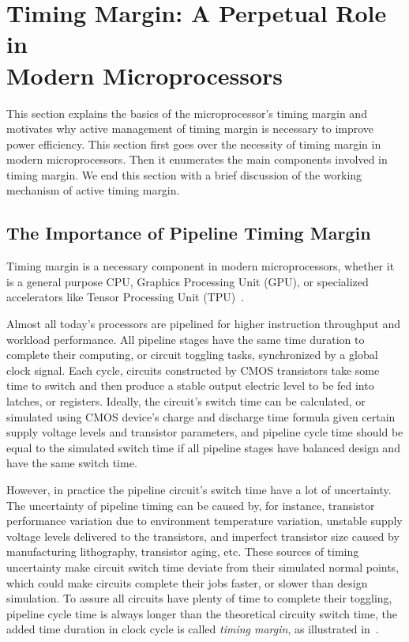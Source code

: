 
\chapter{Timing Margin: A Perpetual Role in \\Modern Microprocessors}
\label{sec:background}

This section explains the basics of the microprocessor's timing margin and motivates why active management of timing margin is necessary to improve power efficiency. This section first goes over the necessity of timing margin in modern microprocessors. Then it enumerates the main components involved in timing margin. We end this section with a brief discussion of the working mechanism of active timing margin.

\section{The Importance of Pipeline Timing Margin}
\label{sec:background:importance}

Timing margin is a necessary component in modern microprocessors, whether it is a general purpose CPU, Graphics Processing Unit (GPU), or specialized accelerators like Tensor Processing Unit (TPU)~\cite{jouppi2017datacenter}.  

Almost all today's processors are pipelined for higher instruction throughput and workload performance. All pipeline stages have the same time duration to complete their computing, or circuit toggling tasks, synchronized by a global clock signal. Each cycle, circuits constructed by CMOS transistors take some time to switch and then produce a stable output electric level to be fed into latches, or registers. Ideally, the circuit's switch time can be calculated, or simulated using CMOS device's charge and discharge time formula given certain supply voltage levels and transistor parameters, and pipeline cycle time should be equal to the simulated switch time if all pipeline stages have balanced design and have the same switch time. 

However, in practice the pipeline circuit's switch time have a lot of uncertainty. The uncertainty of pipeline timing can be caused by, for instance, transistor performance variation due to environment temperature variation, unstable supply voltage levels delivered to the transistors, and imperfect transistor size caused by manufacturing lithography, transistor aging, etc. These sources of timing uncertainty make circuit switch time deviate from their simulated normal points, which could make circuits complete their jobs faster, or slower than design simulation. To assure all circuits have plenty of time to complete their toggling, pipeline cycle time is always longer than the theoretical circuity switch time, the added time duration in clock cycle is called \textit{timing margin}, as illustrated in~. 

